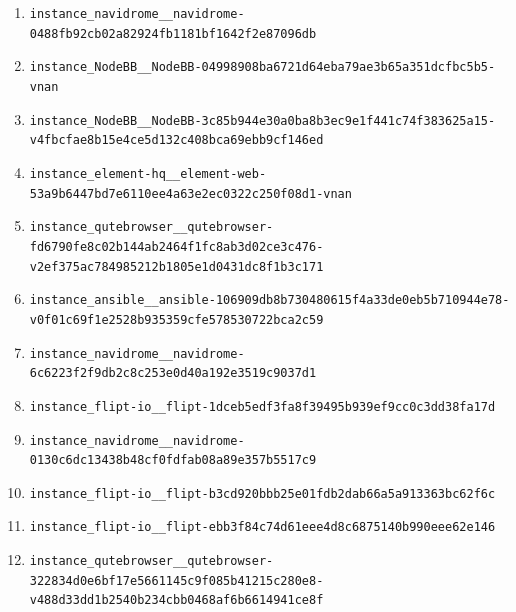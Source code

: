 \begin{enumerate}
\item \texttt{instance\_\allowbreak{}navidrome\_\allowbreak{}\_\allowbreak{}navidrome-\allowbreak{}0488fb92cb02a8\allowbreak{}2924fb1181bf16\allowbreak{}42f2e87096db}
\item \texttt{instance\_\allowbreak{}NodeBB\_\allowbreak{}\_\allowbreak{}NodeBB-\allowbreak{}04998908ba6721\allowbreak{}d64eba79ae3b65\allowbreak{}a351dcfbc5b5-\allowbreak{}vnan}
\item \texttt{instance\_\allowbreak{}NodeBB\_\allowbreak{}\_\allowbreak{}NodeBB-\allowbreak{}3c85b944e30a0b\allowbreak{}a8b3ec9e1f441c\allowbreak{}74f383625a15-\allowbreak{}v4fbcfae8b15e4\allowbreak{}ce5d132c408bca\allowbreak{}69ebb9cf146ed}
\item \texttt{instance\_\allowbreak{}element-\allowbreak{}hq\_\allowbreak{}\_\allowbreak{}element-\allowbreak{}web-\allowbreak{}53a9b6447bd7e6\allowbreak{}110ee4a63e2ec0\allowbreak{}322c250f08d1-\allowbreak{}vnan}
\item \texttt{instance\_\allowbreak{}qutebrowser\_\allowbreak{}\_\allowbreak{}qutebrowser-\allowbreak{}fd6790fe8c02b1\allowbreak{}44ab2464f1fc8a\allowbreak{}b3d02ce3c476-\allowbreak{}v2ef375ac78498\allowbreak{}5212b1805e1d04\allowbreak{}31dc8f1b3c171}
\item \texttt{instance\_\allowbreak{}ansible\_\allowbreak{}\_\allowbreak{}ansible-\allowbreak{}106909db8b7304\allowbreak{}80615f4a33de0e\allowbreak{}b5b710944e78-\allowbreak{}v0f01c69f1e252\allowbreak{}8b935359cfe578\allowbreak{}530722bca2c59}
\item \texttt{instance\_\allowbreak{}navidrome\_\allowbreak{}\_\allowbreak{}navidrome-\allowbreak{}6c6223f2f9db2c\allowbreak{}8c253e0d40a192\allowbreak{}e3519c9037d1}
\item \texttt{instance\_\allowbreak{}flipt-\allowbreak{}io\_\allowbreak{}\_\allowbreak{}flipt-\allowbreak{}1dceb5edf3fa8f\allowbreak{}39495b939ef9cc\allowbreak{}0c3dd38fa17d}
\item \texttt{instance\_\allowbreak{}navidrome\_\allowbreak{}\_\allowbreak{}navidrome-\allowbreak{}0130c6dc13438b\allowbreak{}48cf0fdfab08a8\allowbreak{}9e357b5517c9}
\item \texttt{instance\_\allowbreak{}flipt-\allowbreak{}io\_\allowbreak{}\_\allowbreak{}flipt-\allowbreak{}b3cd920bbb25e0\allowbreak{}1fdb2dab66a5a9\allowbreak{}13363bc62f6c}
\item \texttt{instance\_\allowbreak{}flipt-\allowbreak{}io\_\allowbreak{}\_\allowbreak{}flipt-\allowbreak{}ebb3f84c74d61e\allowbreak{}ee4d8c6875140b\allowbreak{}990eee62e146}
\item \texttt{instance\_\allowbreak{}qutebrowser\_\allowbreak{}\_\allowbreak{}qutebrowser-\allowbreak{}322834d0e6bf17\allowbreak{}e5661145c9f085\allowbreak{}b41215c280e8-\allowbreak{}v488d33dd1b254\allowbreak{}0b234cbb0468af\allowbreak{}6b6614941ce8f}

\end{enumerate}
